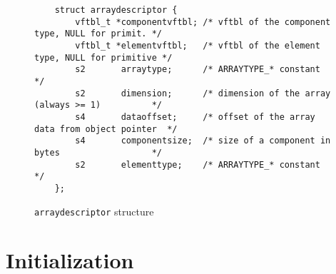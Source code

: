 \begin{figure}[h]
\begin{verbatim}
    struct arraydescriptor {
        vftbl_t *componentvftbl; /* vftbl of the component type, NULL for primit. */
        vftbl_t *elementvftbl;   /* vftbl of the element type, NULL for primitive */
        s2       arraytype;      /* ARRAYTYPE_* constant                          */
        s2       dimension;      /* dimension of the array (always >= 1)          */
        s4       dataoffset;     /* offset of the array data from object pointer  */
        s4       componentsize;  /* size of a component in bytes                  */
        s2       elementtype;    /* ARRAYTYPE_* constant                          */
    };
\end{verbatim}
\caption{\texttt{arraydescriptor} structure}
\label{arraydescriptorstructure}
\end{figure}



\section{Initialization}

